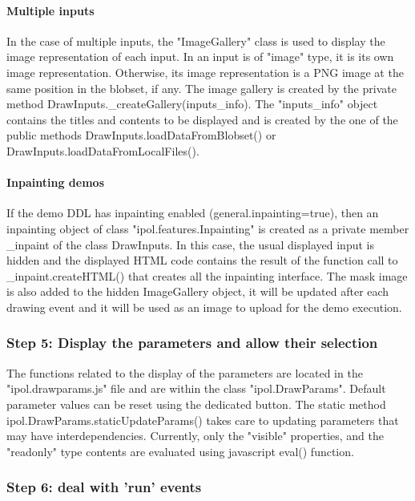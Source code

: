 \paragraph{Multiple inputs}
In the case of multiple inputs, the "ImageGallery" class is used to display the 
image representation of each input. In an input is of "image" type, it is its own
image representation. Otherwise, its image representation is a PNG image at the same
position in the blobset, if any.
The image gallery is created by the private method DrawInputs.\_createGallery(inputs\_info).
The "inputs\_info" object contains the titles and contents to be displayed and is created
by the one of the public methods DrawInputs.loadDataFromBlobset() or DrawInputs.loadDataFromLocalFiles().

\paragraph{Inpainting demos}
If the demo DDL has inpainting enabled (general.inpainting=true), then an inpainting object
of class "ipol.features.Inpainting" is created as a private member \_inpaint of the class
DrawInputs. In this case, the usual displayed input is hidden and the displayed HTML code
contains the result of the function call to \_inpaint.createHTML() that creates all 
the inpainting interface. The mask image is also added to the hidden ImageGallery object,
it will be updated after each drawing event and it will be used as an image to upload
for the demo execution.

\subsubsection{Step 5: Display the parameters and allow their selection}

The functions related to the display of the parameters are located in the "ipol.drawparams.js"
file and are within the class "ipol.DrawParams". Default parameter values can be reset using
the dedicated button.
The static method ipol.DrawParams.staticUpdateParams() takes care to updating parameters
that may have interdependencies. Currently, only the "visible" properties, and the 
"readonly" type contents are evaluated using javascript eval() function.

\subsubsection{Step 6: deal with 'run' events}

